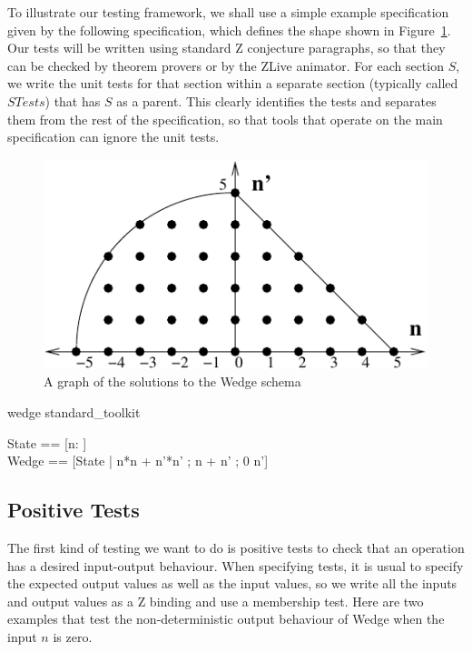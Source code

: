 \documentclass{llncs}
\begin{document}
To illustrate our testing framework, we shall use a simple example
specification given by the following specification, which defines the
shape shown in Figure~\ref{fig:wedge}.  Our tests will be written
using standard Z conjecture paragraphs, so that they can be checked by
theorem provers or by the ZLive animator.  For each section $S$, we
write the unit tests for that section within a separate section
(typically called $STests$) that has $S$ as a parent.  This clearly
identifies the tests and separates them from the rest of the
specification, so that tools that operate on the main specification
can ignore the unit tests.

\begin{figure}[htbp]
  \centering
  \includegraphics{wedge}
  \caption{A graph of the solutions to the Wedge schema}
  \label{fig:wedge}
\end{figure}

\begin{zsection}
  \SECTION wedge \parents standard\_toolkit
\end{zsection}
\begin{zed}
  State == [n:  ] \\
  Wedge == [\Delta State | n*n + n'*n' ; n + n' ; 0 \leq n']
\end{zed}

\subsection{Positive Tests}

The first kind of testing we want to do is positive tests to check
that an operation has a desired input-output behaviour.  When
specifying tests, it is usual to specify the expected output
values as well as the input values, so we write all the inputs and
output values as a Z binding and use a membership test.  Here are two
examples that test the non-deterministic output behaviour of Wedge
when the input $n$ is zero.
\end{document}
